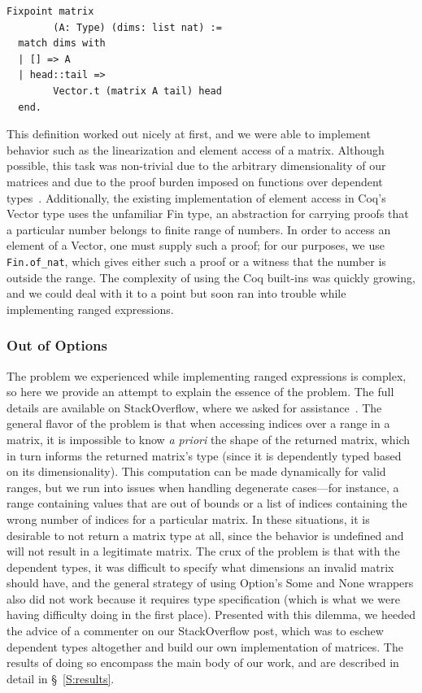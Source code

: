 \documentclass[11pt,conference]{IEEEtran}
\theoremstyle{plain} %
\theoremstyle{definition}
\theoremstyle{remark}
\begin{document}
\begin{verbatim}
Fixpoint matrix
        (A: Type) (dims: list nat) :=
  match dims with
  | [] => A
  | head::tail =>
        Vector.t (matrix A tail) head
  end.

\end{verbatim}

This definition worked out nicely at first, and we were able to implement
behavior such as the linearization and element access of a matrix. Although
possible, this task was non-trivial due to the arbitrary dimensionality of our
matrices and due to the proof burden imposed on functions over dependent
types~\cite{SO_2021_1}. Additionally, the existing implementation of element
access in Coq's \textsf{Vector} type uses the unfamiliar \textsf{Fin} type, an
abstraction for carrying proofs that a particular number belongs to finite range
of numbers. In order to access an element of a \textsf{Vector}, one must supply
such a proof; for our purposes, we use \texttt{Fin.of\_nat}, which gives either
such a proof or a witness that the number is outside the range. The complexity
of using the Coq built-ins was quickly growing, and we could deal with it to a
point but soon ran into trouble while implementing ranged expressions.

\subsubsection{Out of Options}

The problem we experienced while implementing ranged expressions is complex, so
here we provide an attempt to explain the essence of the problem. The full
details are available on StackOverflow, where we asked for
assistance~\cite{SO_2021_2}. The general flavor of the problem is that when
accessing indices over a range in a matrix, it is impossible to know \textit{a
priori} the shape of the returned matrix, which in turn informs the returned
matrix's type (since it is dependently typed based on its dimensionality). This
computation can be made dynamically for valid ranges, but we run into issues
when handling degenerate cases---for instance, a range containing values that
are out of bounds or a list of indices containing the wrong number of indices
for a particular matrix. In these situations, it is desirable to not return a
matrix type at all, since the behavior is undefined and will not result in a
legitimate matrix. The crux of the problem is that with the dependent types, it
was difficult to specify what dimensions an invalid matrix should have, and the
general strategy of using \textsf{Option}'s \textsf{Some} and \textsf{None}
wrappers also did not work because it requires type specification (which is what
we were having difficulty doing in the first place). Presented with this
dilemma, we heeded the advice of a commenter on our StackOverflow post, which
was to eschew dependent types altogether and build our own implementation of
matrices. The results of doing so encompass the main body of our work, and are
described in detail in \S~\ref{S:results}.
\end{document}
